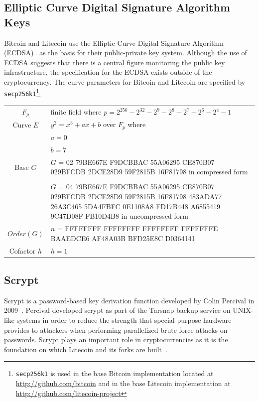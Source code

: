 \documentclass[11pt]{article}
\begin{document}
\subsection{Elliptic Curve Digital Signature Algorithm Keys} Bitcoin and Litecoin use the Elliptic Curve Digital
Signature Algorithm (ECDSA)~\cite{johnson01} as the basis for their public-private key system. Although the use of ECDSA
suggests that there is a central figure monitoring the public key infrastructure, the specification for the ECDSA exists
outside of the cryptocurrency. The curve parameters for Bitcoin and Litecoin are specified by {\tt
secp256k1}\footnote{{\tt secp256k1} is used in the base Bitcoin implementation located at
\url{http://github.com/bitcoin} and in the base Litecoin implementation at
\url{http://github.com/litecoin-project}}\cite{secg}: \vspace{1em}\\ \begin{tabularx}{\textwidth}{cX} $F_p$ & finite
field where $p = 2^{256} - 2^{32} - 2^9 - 2^8 - 2^7 - 2^6 - 2^4 - 1$\\ Curve $E$ & $y^2 = x^3 + ax + b$ over $F_p$
where\\ & $a = 0$\\ & $b = 7$\\ Base $G$ & $G$ = 02 79BE667E F9DCBBAC 55A06295 CE870B07 029BFCDB 2DCE28D9 59F2815B
16F81798 in compressed form\\ & \\ & $G$ = 04 79BE667E F9DCBBAC 55A06295 CE870B07 029BFCDB 2DCE28D9 59F2815B 16F81798
483ADA77 26A3C465 5DA4FBFC 0E1108A8 FD17B448 A6855419 9C47D08F FB10D4B8 in uncompressed form\\ $Order(G)$ & $n$ =
FFFFFFFF FFFFFFFF FFFFFFFF FFFFFFFE BAAEDCE6 AF48A03B BFD25E8C D0364141\\ Cofactor $h$ & $h = 1$ \end{tabularx}

\subsection{Scrypt} Scrypt is a password-based key derivation function developed by Colin Percival in
2009~\cite{percival09}. Percival developed scrypt as part of the Tarsnap backup service on UNIX-like systems in order to
reduce the strength that special purpose hardware provides to attackers when performing parallelized brute force attacks
on passwords. Scrypt plays an important role in cryptocurrencies as it is the foundation on which Litecoin and its forks
are built~\cite{sprankel13}.
\end{document}

